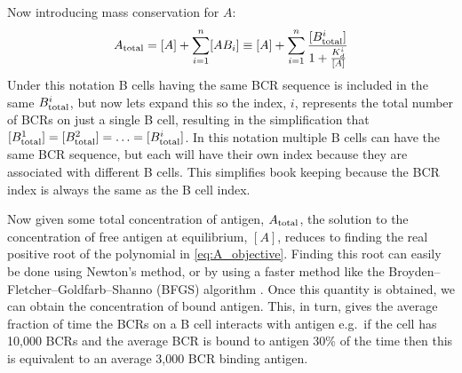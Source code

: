 \noindent
Now introducing mass conservation for $A$:
\begin{equation}
A_{\text{total}} = [A] + \sum_{i=1}^{n} [AB_i] \equiv [A] + \sum_{i=1}^{n} \frac{[B^i_{\text{total}}]}{1 + \frac{K^i_d}{[A]}}
  \label{eq:A_objective}
\end{equation}
Under this notation B cells having the same BCR sequence is included in the same $B^i_{\text{total}}$, but now lets expand this so the index, $i$, represents the total number of BCRs on just a single B cell, resulting in the simplification that $[B^1_{\text{total}}] = [B^2_{\text{total}}] = \ldots = [B^i_{\text{total}}]$.
In this notation multiple B cells can have the same BCR sequence, but each will have their own index because they are associated with different B cells.
This simplifies book keeping because the BCR index is always the same as the B cell index.

Now given some total concentration of antigen, $A_{\text{total}}$, the solution to the concentration of free antigen at equilibrium, $[A]$, reduces to finding the real positive root of the polynomial in \eqref{eq:A_objective}.
Finding this root can easily be done using Newton's method, or by using a faster method like the Broyden–Fletcher–Goldfarb–Shanno (BFGS) algorithm \cite{shanno1985broyden}.
Once this quantity is obtained, we can obtain the concentration of bound antigen.
This, in turn, gives the average fraction of time the BCRs on a B cell interacts with antigen e.g.\ if the cell has 10,000 BCRs and the average BCR is bound to antigen 30\% of the time then this is equivalent to an average 3,000 BCR binding antigen.




